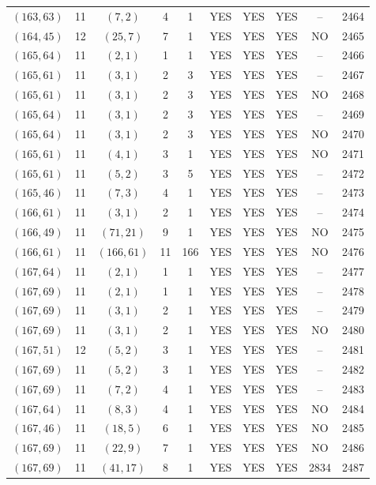 \begin{longtable}{|c|c|c|c|c|c|c|c|c|c|}
$(163, 63)$ & 11 & $(7, 2)$ & 4 & 1 & YES & YES & YES & -- & 2464\\
$(164, 45)$ & 12 & $(25, 7)$ & 7 & 1 & YES & YES & YES & NO & 2465\\
$(165, 64)$ & 11 & $(2, 1)$ & 1 & 1 & YES & YES & YES & -- & 2466\\
$(165, 61)$ & 11 & $(3, 1)$ & 2 & 3 & YES & YES & YES & -- & 2467\\
$(165, 61)$ & 11 & $(3, 1)$ & 2 & 3 & YES & YES & YES & NO & 2468\\
$(165, 64)$ & 11 & $(3, 1)$ & 2 & 3 & YES & YES & YES & -- & 2469\\
$(165, 64)$ & 11 & $(3, 1)$ & 2 & 3 & YES & YES & YES & NO & 2470\\
$(165, 61)$ & 11 & $(4, 1)$ & 3 & 1 & YES & YES & YES & NO & 2471\\
$(165, 61)$ & 11 & $(5, 2)$ & 3 & 5 & YES & YES & YES & -- & 2472\\
$(165, 46)$ & 11 & $(7, 3)$ & 4 & 1 & YES & YES & YES & -- & 2473\\
$(166, 61)$ & 11 & $(3, 1)$ & 2 & 1 & YES & YES & YES & -- & 2474\\
$(166, 49)$ & 11 & $(71, 21)$ & 9 & 1 & YES & YES & YES & NO & 2475\\
$(166, 61)$ & 11 & $(166, 61)$ & 11 & 166 & YES & YES & YES & NO & 2476\\
$(167, 64)$ & 11 & $(2, 1)$ & 1 & 1 & YES & YES & YES & -- & 2477\\
$(167, 69)$ & 11 & $(2, 1)$ & 1 & 1 & YES & YES & YES & -- & 2478\\
$(167, 69)$ & 11 & $(3, 1)$ & 2 & 1 & YES & YES & YES & -- & 2479\\
$(167, 69)$ & 11 & $(3, 1)$ & 2 & 1 & YES & YES & YES & NO & 2480\\
$(167, 51)$ & 12 & $(5, 2)$ & 3 & 1 & YES & YES & YES & -- & 2481\\
$(167, 69)$ & 11 & $(5, 2)$ & 3 & 1 & YES & YES & YES & -- & 2482\\
$(167, 69)$ & 11 & $(7, 2)$ & 4 & 1 & YES & YES & YES & -- & 2483\\
$(167, 64)$ & 11 & $(8, 3)$ & 4 & 1 & YES & YES & YES & NO & 2484\\
$(167, 46)$ & 11 & $(18, 5)$ & 6 & 1 & YES & YES & YES & NO & 2485\\
$(167, 69)$ & 11 & $(22, 9)$ & 7 & 1 & YES & YES & YES & NO & 2486\\
$(167, 69)$ & 11 & $(41, 17)$ & 8 & 1 & YES & YES & YES & 2834 & 2487\\

\end{longtable}
